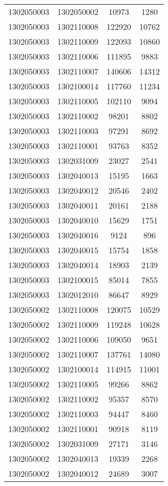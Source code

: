 \begin{longtable}[h]{llcc}
		1302050003 & 1302050002 & 10973 & 1280\\
		1302050003 & 1302110008 & 122920 & 10762\\
		1302050003 & 1302110009 & 122093 & 10860\\
		1302050003 & 1302110006 & 111895 & 9883\\
		1302050003 & 1302110007 & 140606 & 14312\\
		1302050003 & 1302100014 & 117760 & 11234\\
		1302050003 & 1302110005 & 102110 & 9094\\
		1302050003 & 1302110002 & 98201 & 8802\\
		1302050003 & 1302110003 & 97291 & 8692\\
		1302050003 & 1302110001 & 93763 & 8352\\
		1302050003 & 1302031009 & 23027 & 2541\\
		1302050003 & 1302040013 & 15195 & 1663\\
		1302050003 & 1302040012 & 20546 & 2402\\
		1302050003 & 1302040011 & 20161 & 2188\\
		1302050003 & 1302040010 & 15629 & 1751\\
		1302050003 & 1302040016 & 9124 & 896\\
		1302050003 & 1302040015 & 15754 & 1858\\
		1302050003 & 1302040014 & 18903 & 2139\\
		1302050003 & 1302100015 & 85014 & 7855\\
		1302050003 & 1302012010 & 86647 & 8929\\
		1302050002 & 1302110008 & 120075 & 10529\\
		1302050002 & 1302110009 & 119248 & 10628\\
		1302050002 & 1302110006 & 109050 & 9651\\
		1302050002 & 1302110007 & 137761 & 14080\\
		1302050002 & 1302100014 & 114915 & 11001\\
		1302050002 & 1302110005 & 99266 & 8862\\
		1302050002 & 1302110002 & 95357 & 8570\\
		1302050002 & 1302110003 & 94447 & 8460\\
		1302050002 & 1302110001 & 90918 & 8119\\
		1302050002 & 1302031009 & 27171 & 3146\\
		1302050002 & 1302040013 & 19339 & 2268\\
		1302050002 & 1302040012 & 24689 & 3007\\

\end{longtable}

